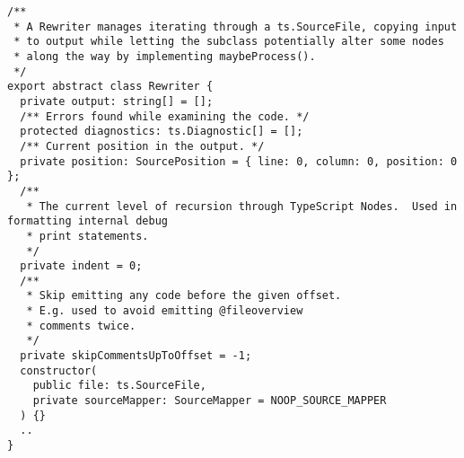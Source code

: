 \begin{verbatim}
/**
 * A Rewriter manages iterating through a ts.SourceFile, copying input
 * to output while letting the subclass potentially alter some nodes
 * along the way by implementing maybeProcess().
 */
export abstract class Rewriter {
  private output: string[] = [];
  /** Errors found while examining the code. */
  protected diagnostics: ts.Diagnostic[] = [];
  /** Current position in the output. */
  private position: SourcePosition = { line: 0, column: 0, position: 0 };
  /**
   * The current level of recursion through TypeScript Nodes.  Used in
formatting internal debug
   * print statements.
   */
  private indent = 0;
  /**
   * Skip emitting any code before the given offset.
   * E.g. used to avoid emitting @fileoverview
   * comments twice.
   */
  private skipCommentsUpToOffset = -1;
  constructor(
    public file: ts.SourceFile,
    private sourceMapper: SourceMapper = NOOP_SOURCE_MAPPER
  ) {}
  ..
}
\end{verbatim}
